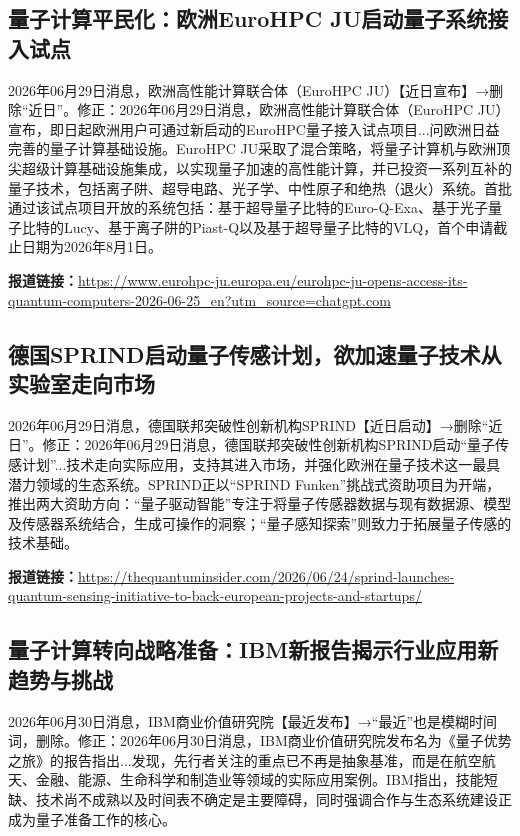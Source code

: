 \documentclass[12pt,a4paper]{ctexart}
\begin{document}
\subsection{ 量子计算平民化：欧洲EuroHPC JU启动量子系统接入试点 }

2026年06月29日消息，欧洲高性能计算联合体（EuroHPC JU）【近日宣布】→删除“近日”。修正：2026年06月29日消息，欧洲高性能计算联合体（EuroHPC JU）宣布，即日起欧洲用户可通过新启动的EuroHPC量子接入试点项目...问欧洲日益完善的量子计算基础设施。EuroHPC JU采取了混合策略，将量子计算机与欧洲顶尖超级计算基础设施集成，以实现量子加速的高性能计算，并已投资一系列互补的量子技术，包括离子阱、超导电路、光子学、中性原子和绝热（退火）系统。首批通过该试点项目开放的系统包括：基于超导量子比特的Euro-Q-Exa、基于光子量子比特的Lucy、基于离子阱的Piast-Q以及基于超导量子比特的VLQ，首个申请截止日期为2026年8月1日。

\noindent\textbf{报道链接：}\url{https://www.eurohpc-ju.europa.eu/eurohpc-ju-opens-access-its-quantum-computers-2026-06-25\_en?utm\_source=chatgpt.com}

\subsection{ 德国SPRIND启动量子传感计划，欲加速量子技术从实验室走向市场 }

2026年06月29日消息，德国联邦突破性创新机构SPRIND【近日启动】→删除“近日”。修正：2026年06月29日消息，德国联邦突破性创新机构SPRIND启动“量子传感计划”...技术走向实际应用，支持其进入市场，并强化欧洲在量子技术这一最具潜力领域的生态系统。SPRIND正以“SPRIND Funken”挑战式资助项目为开端，推出两大资助方向：“量子驱动智能”专注于将量子传感器数据与现有数据源、模型及传感器系统结合，生成可操作的洞察；“量子感知探索”则致力于拓展量子传感的技术基础。

\noindent\textbf{报道链接：}\url{https://thequantuminsider.com/2026/06/24/sprind-launches-quantum-sensing-initiative-to-back-european-projects-and-startups/}

\subsection{ 量子计算转向战略准备：IBM新报告揭示行业应用新趋势与挑战 }

2026年06月30日消息，IBM商业价值研究院【最近发布】→“最近”也是模糊时间词，删除。修正：2026年06月30日消息，IBM商业价值研究院发布名为《量子优势之旅》的报告指出...发现，先行者关注的重点已不再是抽象基准，而是在航空航天、金融、能源、生命科学和制造业等领域的实际应用案例。IBM指出，技能短缺、技术尚不成熟以及时间表不确定是主要障碍，同时强调合作与生态系统建设正成为量子准备工作的核心。
\end{document}

